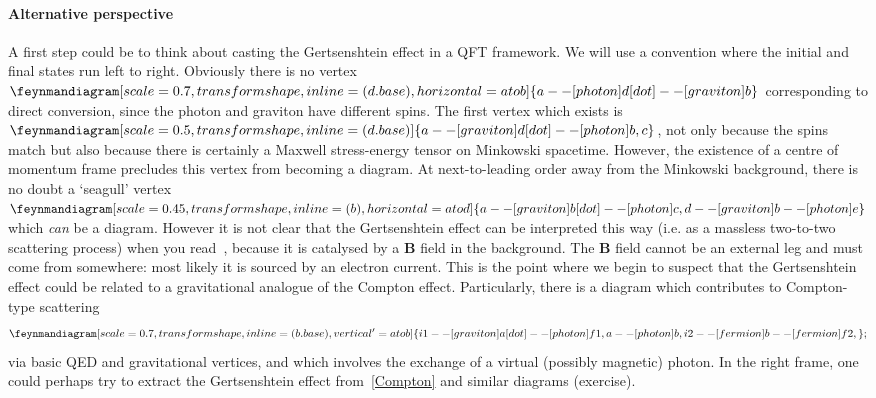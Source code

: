 \documentclass[aps,prd,reprint,preprintnumbers,showpacs,floatfix,nofootinbib,superscript address,longbibliography]{revtex4-2}
\begin{document}
\paragraph*{Alternative perspective} A first step could be to think about casting the Gertsenshtein effect in a QFT framework. We will use a convention where the initial and final states run left to right. Obviously there is no vertex $\feynmandiagram[scale=0.7,transform shape, inline=(d.base), horizontal=a to b]{a -- [photon] d [dot] -- [graviton] b}$ corresponding to direct conversion, since the photon and graviton have different spins. The first vertex which exists is $\feynmandiagram[scale=0.5,transform shape, inline=(d.base)]{a -- [graviton] d [dot] -- [photon] {b,c}}$, not only because the spins match but also because there is certainly a Maxwell stress-energy tensor on Minkowski spacetime. However, the existence of a centre of momentum frame precludes this vertex from becoming a diagram. At next-to-leading order away from the Minkowski background, there is no doubt a `seagull' vertex $\feynmandiagram[scale=0.45,transform shape, inline=(b), horizontal=a to d]{a -- [graviton] b [dot] -- [photon] c,d -- [graviton] b -- [photon] e}$ which \emph{can} be a diagram. However it is not clear that the Gertsenshtein effect can be interpreted this way (i.e. as a massless two-to-two scattering process) when you read~\cite{Palessandro:2023tee}, because it is catalysed by a $\textbf{B}$ field in the background. The $\textbf{B}$ field cannot be an external leg and must come from somewhere: most likely it is sourced by an electron current. This is the point where we begin to suspect that the Gertsenshtein effect could be related to a gravitational analogue of the Compton effect. Particularly, there is a diagram which contributes to Compton-type scattering 
\begin{equation}\label{Compton}
\feynmandiagram [scale=0.7,transform shape, inline=(b.base),vertical'=a to b] {
i1 
-- [graviton] a [dot]
-- [photon] f1,
a -- [photon] b,
i2 
-- [fermion] b
-- [fermion] f2,
};
\end{equation}
via basic QED and gravitational vertices, and which involves the exchange of a virtual (possibly magnetic) photon. In the right frame, one could perhaps try to extract the Gertsenshtein effect from~\cref{Compton} and similar diagrams (exercise).
\end{document}
